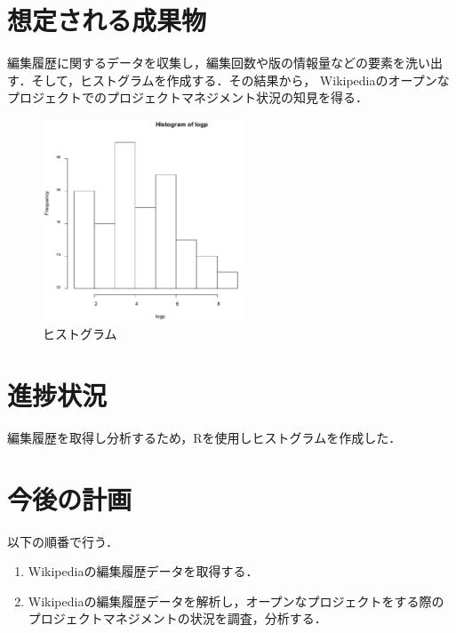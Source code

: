 \documentclass[uplatex,twocolumn,dvipdfmx]{jsarticle}
\begin{document}
\section{想定される成果物}

編集履歴に関するデータを収集し，編集回数や版の情報量などの要素を洗い出す．そして，ヒストグラムを作成する．その結果から，
Wikipediaのオープンなプロジェクトでのプロジェクトマネジメント状況の知見を得る．

\begin{figure}[h]
\centering
\includegraphics[width=6cm,clip]{figure1.pdf}
\caption{ヒストグラム}\label{サンプル図}
\end{figure}

\section{進捗状況}

編集履歴を取得し分析するため，Rを使用しヒストグラムを作成した．


\section{今後の計画}

以下の順番で行う．

\begin{enumerate}

 \item Wikipediaの編集履歴データを取得する．
 \item Wikipediaの編集履歴データを解析し，オープンなプロジェクトをする際のプロジェクトマネジメントの状況を調査，分析する．

\end{enumerate}



\end{document}
